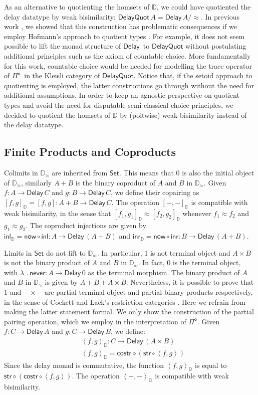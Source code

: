 \documentclass[runningheads]{llncs}
\newcommand{\Pio}{$\mathsf{\Pi}^{\mathsf{o}}$}
\newcommand{\Set}{\mathsf{Set}}
\newcommand{\comp}{\circ}
\newcommand{\copair}[2]{[#1,#2]}
\newcommand{\pair}[2]{\left< #1,#2 \right>}
\newcommand{\inl}{\mathsf{inl}}
\newcommand{\inr}{\mathsf{inr}}
\newcommand{\Delay}{\mathsf{Delay}\,}
\newcommand{\now}{\mathsf{now}}
\newcommand{\never}{\mathsf{never}}
\newcommand{\str}{\mathsf{str}}
\newcommand{\costr}{\mathsf{costr}}
\newcommand{\D}{\mathbb{D}}
\newcommand{\Dapprox}{\mathbb{D}_{\approx}}
\newcommand{\copairD}[2]{[#1,#2]_{\D}}
\newcommand{\pairD}[2]{\left< #1,#2 \right>_{\D}}
\newcommand{\inlD}{\mathsf{inl}_{\D}}
\newcommand{\inrD}{\mathsf{inr}_{\D}}
\begin{document}
As an alternative to quotienting the homsets of $\D$, we could have
quotiented the delay datatype by weak bisimilarity:
$\mathsf{DelayQuot}\,A = \Delay A/{\approx}$. In previous work
\cite{ChapmanUV19}, we showed that this construction has problematic
consequences if we employ Hofmann's approach to quotient types
\cite{Hofmann}. For example, it does not seem possible to lift the
monad structure of $\Delay$ to $\mathsf{DelayQuot}$ without
postulating additional principles such as the axiom of countable
choice. More fundamentally for this work, countable choice would be
needed for modelling the trace operator of \Pio\ in the Kleisli
category of $\mathsf{DelayQuot}$. Notice that, if the setoid approach
to quotienting is employed, the latter constructions go through
without the need for additional assumptions. In order to keep an
agnostic perspective on quotient types and avoid the need for
disputable semi-classical choice principles, we decided to quotient
the homsets of $\D$ by (poitwise) weak bisimilarity instead of the
delay datatype.

\subsection{Finite Products and Coproducts}
\label{sec:prod}

Colimits in $\Dapprox$ are inherited from $\Set$. This means that 0 is
also the initial object of $\Dapprox$, similarly $A + B$ is the
binary coproduct of $A$ and $B$ in $\Dapprox$. Given $f : A \to
\Delay C$ and $g : B \to \Delay C$, we define their copairing as
$\copairD f g = \copair f g : A + B \to \Delay C$. The operation
$\copairD - -$ is compatible with weak bisimilarity, in the sense that
$\copairD{f_1}{g_1} \approx \copairD{f_2}{g_2}$ whenever $f_1 \approx f_2$
and $g_1 \approx g_2$.
The coproduct
injections are given by $\inlD = \now \comp \inl : A \to \Delay (A +
B)$ and $\inrD = \now \comp \inr : B \to \Delay (A + B)$.


Limits in $\Set$ do not lift to $\Dapprox$. In particular, 1 is not
terminal object and $A \times B$ is not the binary product of $A$ and
$B$ in $\Dapprox$. In fact, 0 is the terminal object, with
$\lambda \_.\, \never : A \to \Delay 0$ as the terminal morphism.  The
binary product of $A$ and $B$ in $\Dapprox$ is given by
$A + B + A \times B$. Nevertheless, it is possible to prove that 1 and
$- \times -$ are partial terminal object and partial binary products
respectively, in the sense of Cockett and Lack's restriction
categories \cite{CockettL07}. Here we refrain from making the latter
statement formal. We only show the construction of the partial pairing
operation, which we employ in the interpretation of \Pio.  Given
$f : C \to \Delay A$ and $g : C \to \Delay B$, we define:
\begin{align*}
& \pairD f g : C \to \Delay (A \times B) \\
& \pairD f g = \costr \diamond (\str \comp \pair f g)
\end{align*}
Since the delay monad is commutative, the function $\pairD f g$ is
equal to $\str \diamond (\costr \comp \pair f g)$. The operation
$\pairD - -$ is compatible with weak bisimilarity.
\end{document}
